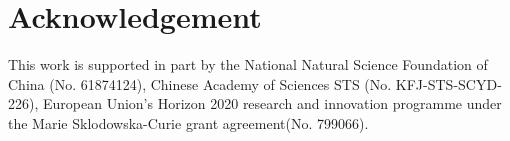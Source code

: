 \section*{Acknowledgement}
This work is supported in part by the National Natural Science Foundation 
of China (No. 61874124), Chinese Academy of Sciences STS (No. KFJ-STS-SCYD-226), 
European Union's Horizon 2020 research and innovation programme under the 
Marie Sklodowska-Curie grant agreement(No. 799066).
